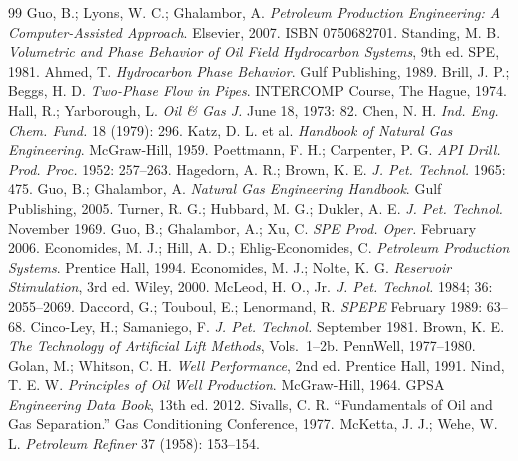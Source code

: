 \documentclass[11pt,a4paper,openany]{book}
\begin{document}
\begin{thebibliography}{99}
 Guo, B.; Lyons, W. C.; Ghalambor, A.
\emph{Petroleum Production Engineering: A Computer-Assisted
Approach}. Elsevier, 2007. ISBN 0750682701.
 Standing, M. B. \emph{Volumetric and Phase
Behavior of Oil Field Hydrocarbon Systems}, 9th ed. SPE, 1981.
 Ahmed, T. \emph{Hydrocarbon Phase Behavior}.
Gulf Publishing, 1989.
 Brill, J. P.; Beggs, H. D. \emph{Two-Phase
Flow in Pipes}. INTERCOMP Course, The Hague, 1974.
 Hall, R.; Yarborough, L. \emph{Oil \& Gas J.}
June 18, 1973: 82.
 Chen, N. H. \emph{Ind. Eng. Chem. Fund.} 18
(1979): 296.
 Katz, D. L. et al. \emph{Handbook of Natural Gas
Engineering}. McGraw-Hill, 1959.
 Poettmann, F. H.; Carpenter, P. G.
\emph{API Drill. Prod. Proc.} 1952: 257--263.
 Hagedorn, A. R.; Brown, K. E. \emph{J. Pet.
Technol.} 1965: 475.
 Guo, B.; Ghalambor, A. \emph{Natural Gas
Engineering Handbook}. Gulf Publishing, 2005.
 Turner, R. G.; Hubbard, M. G.; Dukler, A. E.
\emph{J. Pet. Technol.} November 1969.
 Guo, B.; Ghalambor, A.; Xu, C. \emph{SPE Prod.
Oper.} February 2006.
 Economides, M. J.; Hill, A. D.;
Ehlig-Economides, C. \emph{Petroleum Production Systems}.
Prentice Hall, 1994.
 Economides, M. J.; Nolte, K. G.
\emph{Reservoir Stimulation}, 3rd ed. Wiley, 2000.
 McLeod, H. O., Jr. \emph{J. Pet. Technol.}
1984; 36: 2055--2069.
 Daccord, G.; Touboul, E.; Lenormand, R.
\emph{SPEPE} February 1989: 63--68.
 Cinco-Ley, H.; Samaniego, F. \emph{J. Pet.
Technol.} September 1981.
 Brown, K. E. \emph{The Technology of
Artificial Lift Methods}, Vols.~1--2b. PennWell, 1977--1980.
 Golan, M.; Whitson, C. H. \emph{Well
Performance}, 2nd ed. Prentice Hall, 1991.
 Nind, T. E. W. \emph{Principles of Oil Well
Production}. McGraw-Hill, 1964.
 GPSA \emph{Engineering Data Book}, 13th ed. 2012.
 Sivalls, C. R. ``Fundamentals of Oil and Gas
Separation.'' Gas Conditioning Conference, 1977.
 McKetta, J. J.; Wehe, W. L. \emph{Petroleum
Refiner} 37 (1958): 153--154.
\end{thebibliography}

\backmatter
\printindex
\end{document}
